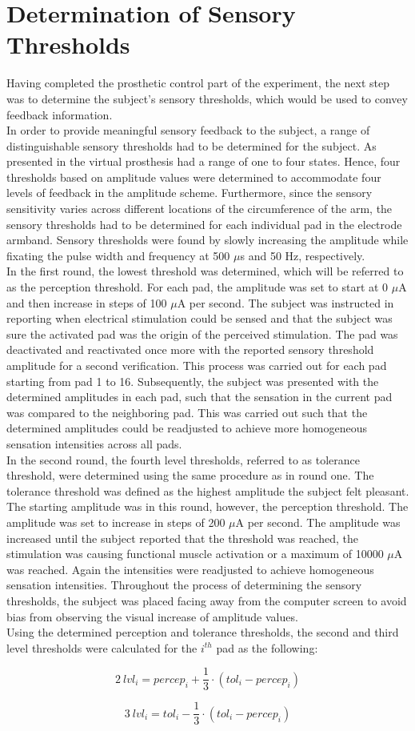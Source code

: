 
\section{Determination of Sensory Thresholds}

Having completed the prosthetic control part of the experiment, the next step was to determine the subject's sensory thresholds, which would be used to convey feedback information.\\
In order to provide meaningful sensory feedback to the subject, a range of distinguishable sensory thresholds had to be determined for the subject. As presented in  the virtual prosthesis had a range of one to four states. Hence, four thresholds based on amplitude values were determined to accommodate four levels of feedback in the amplitude scheme. Furthermore, since the sensory sensitivity varies across different locations of the circumference of the arm, the sensory thresholds had to be determined for each individual pad in the electrode armband. Sensory thresholds were found by slowly increasing the amplitude while fixating the pulse width and frequency at 500 $\mu$s and 50 Hz, respectively. \\
In the first round, the lowest threshold was determined, which will be referred to as the perception threshold. For each pad, the amplitude was set to start at 0 $\mu $A and then increase in steps of 100 $\mu$A per second. The subject was instructed in reporting when electrical stimulation could be sensed and that the subject was sure the activated pad was the origin of the perceived stimulation. The pad was deactivated and reactivated once more with the reported sensory threshold amplitude for a second verification. This process was carried out for each pad starting from pad 1 to 16. Subsequently, the subject was presented with the determined amplitudes in each pad, such that the sensation in the current pad was compared to the neighboring pad. This was carried out such that the determined amplitudes could be readjusted to achieve more homogeneous sensation intensities across all pads.  \\
In the second round, the fourth level thresholds, referred to as tolerance threshold, were determined using the same procedure as in round one. The tolerance threshold was defined as the highest amplitude the subject felt pleasant. The starting amplitude was in this round, however, the perception threshold. The amplitude was set to increase in steps of 200 $\mu$A per second. The amplitude was increased until the subject reported that the threshold was reached, the stimulation was causing functional muscle activation or a maximum of 10000 $\mu$A was reached. Again the intensities were readjusted to achieve homogeneous sensation intensities. Throughout the process of determining the sensory thresholds, the subject was placed facing away from the computer screen to avoid bias from observing the visual increase of amplitude values.  \\ 
Using the determined perception and tolerance thresholds, the second and third level thresholds were calculated for the $i^{th}$ pad as the following:

	\begin{equation}
2~lvl_i = percep_i + \frac{1}{3} \cdot (tol_i - percep_i)
\end{equation}

\begin{equation}
3~lvl_i = tol_i - \frac{1}{3} \cdot (tol_i - percep_i)
\end{equation}
       